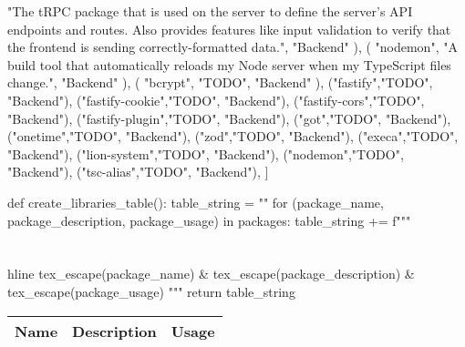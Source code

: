 \documentclass[12pt]{report}
\begin{document}
\begin{pycode}
		"The tRPC package that is used on the server to define the server's API endpoints and routes. Also provides features like input validation to verify that the frontend is sending correctly-formatted data.",
		"Backend"
	),
	(
		"nodemon",
		"A build tool that automatically reloads my Node server when my TypeScript files change.",
		"Backend"
	),
	(
		"bcrypt",
		"TODO",
		"Backend"
	),
	("fastify","TODO", "Backend"),
	("fastify-cookie","TODO", "Backend"),
	("fastify-cors","TODO", "Backend"),
	("fastify-plugin","TODO", "Backend"),
	("got","TODO", "Backend"),
	("onetime","TODO", "Backend"),
	("zod","TODO", "Backend"),
	("execa","TODO", "Backend"),
	("lion-system","TODO", "Backend"),
	("nodemon","TODO", "Backend"),
	("tsc-alias","TODO", "Backend"),
]

def create_libraries_table():
	table_string = ""
	for (package_name, package_description, package_usage) in packages:
		table_string += f"""
			\\\\\\hline
			{tex_escape(package_name)} &
			{tex_escape(package_description)} &
			{tex_escape(package_usage)}
		"""
	return table_string
\end{pycode}

\def\arraystretch{1.5}
\noindent\begin{xltabular}{\textwidth}{|
	p{0.3\textwidth\RaggedRight}|
	X|
	p{0.12\textwidth\RaggedRight}|}
	\hline
	Name &
	Description &
	Usage
	\\\hline
\end{xltabular}
\end{document}
